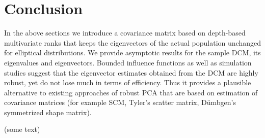 

\section{Conclusion}\label{section:sec7}

In the above sections we introduce a covariance matrix based on depth-based multivariate ranks that keeps the eigenvectors of the actual population unchanged for elliptical distributions. We provide asymptotic results for the sample DCM, its eigenvalues and eigenvectors. Bounded influence functions as well as simulation studies suggest that the eigenvector estimates obtained from the DCM are highly robust, yet do not lose much in terms of efficiency. Thus it provides a plausible alternative to existing approaches of robust PCA that are based on estimation of covariance matrices (for example SCM, Tyler's scatter matrix, D\"{u}mbgen's symmetrized shape matrix).

{\colrbf (some text)}
